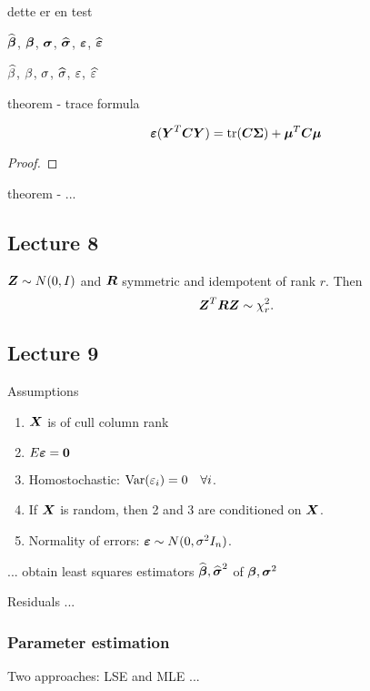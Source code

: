 

dette er en test

$\Bh$, $\B$, $\S$, $\Sh$, $\E$, $\Eh$

$\bh$, $\b$, $\s$, $\sh$, $\e$, $\eh$


theorem - trace formula 
\begin{theorem} 
    $$
        \E(\Y^T\bs{C}\Y) = \mr{tr}(\bs{C\Sigma}) + \M^T\bs{C}\M
    $$    
\end{theorem}
\begin{proof}
    \TODO{}
\end{proof}

theorem - ...


\subsection*{Lecture 8}

\begin{theorem}
    $\bs{Z}\sim N(0, I)$ and $\bs{R}$ symmetric and idempotent of rank $r$. Then 
    $$
        \bs{Z}^T \bs{R} \bs{Z} \sim \chi^2_r.
    $$
\end{theorem}


\subsection*{Lecture 9}

Assumptions
\begin{enumerate}
    \item $\X$ is of cull column rank
    \item $E\E=\boldsymbol{0}$
    \item Homostochastic: $\var(\e_i) = 0 \quad\forall i$.
    \item If $\X$ is random, then 2 and 3 are conditioned on $\X$. 
    \item Normality of errors: $\E\sim N(0, \s^2I_n)$.
\end{enumerate}

... obtain least squares estimators $\Bh, \Sh^2$ of $\B, \S^2$

Residuals ...

\subsubsection*{Parameter estimation}

Two approaches: LSE and MLE ...


